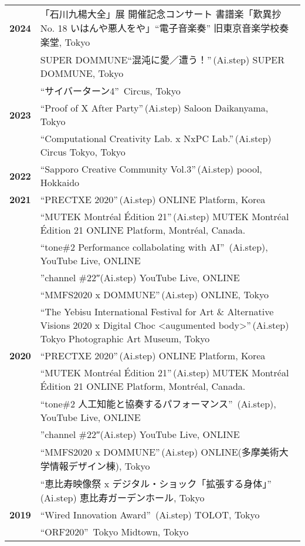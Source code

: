 \documentclass[8pt,a4paper]{article}
\begin{document}
\begin{longtable}{@{}p{1.2cm}@{\hspace{0.5cm}}p{14cm}@{}}
\textbf{2024} & 「石川九楊大全」展 開催記念コンサート 書譜楽「歎異抄 No. 18 いはんや悪人をや」``電子音楽奏'' 旧東京音楽学校奏楽堂, Tokyo \\
& SUPER DOMMUNE``混沌に愛／遭う！''\,(Ai.step) SUPER DOMMUNE, Tokyo \\
& ``サイバーターン4''\, Circus, Tokyo \\[0.2em]
\textbf{2023} & ``Proof of X After Party''\,(Ai.step) Saloon Daikanyama, Tokyo \\
& ``Computational Creativity Lab. x NxPC Lab.''\,(Ai.step) Circus Tokyo, Tokyo \\[0.2em]
\textbf{2022} & ``Sapporo Creative Community Vol.3''\,(Ai.step) poool, Hokkaido \\[0.2em]
\textbf{2021} & ``PRECTXE 2020''\,(Ai.step) ONLINE Platform, Korea \\
& ``MUTEK Montréal Édition 21''\,(Ai.step) MUTEK Montréal Édition 21 ONLINE Platform, Montréal, Canada. \\
& ``tone\#2 Performance collabolating with AI''\, (Ai.step), YouTube Live, ONLINE \\
& ''channel \#22″(Ai.step) YouTube Live, ONLINE \\
& ``MMFS2020 x DOMMUNE''\,(Ai.step) ONLINE, Tokyo \\
& ``The Yebisu International Festival for Art \& Alternative Visions 2020 x Digital Choc <augumented body>''\,(Ai.step) Tokyo Photographic Art Museum, Tokyo \\[0.2em]
\textbf{2020} & ``PRECTXE 2020''\,(Ai.step) ONLINE Platform, Korea \\
& ``MUTEK Montréal Édition 21''\,(Ai.step) MUTEK Montréal Édition 21 ONLINE Platform, Montréal, Canada. \\
& ``tone\#2 人工知能と協奏するパフォーマンス''\, (Ai.step), YouTube Live, ONLINE \\
& ''channel \#22″(Ai.step) YouTube Live, ONLINE \\
& ``MMFS2020 x DOMMUNE''\,(Ai.step) ONLINE(多摩美術大学情報デザイン棟), Tokyo \\
& ``恵比寿映像祭 x デジタル・ショック「拡張する身体」''\,(Ai.step) 恵比寿ガーデンホール, Tokyo \\[0.2em]
\textbf{2019} & ``Wired Innovation Award''\, (Ai.step) TOLOT, Tokyo \\
& ``ORF2020''\, Tokyo Midtown, Tokyo \\

\end{longtable}
\end{document}
